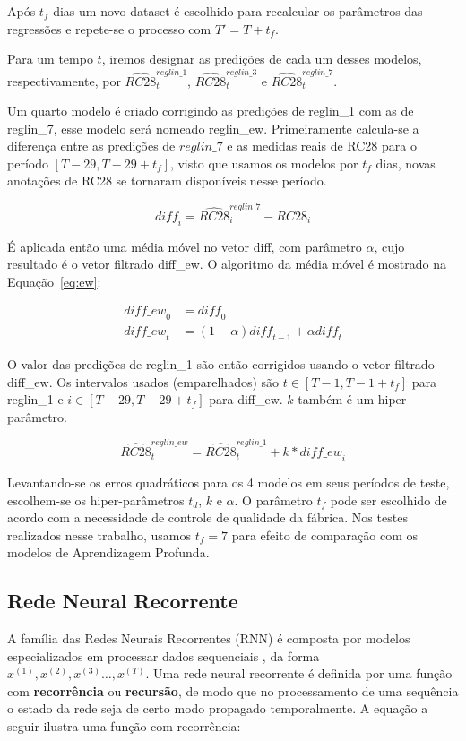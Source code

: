 Após $t_f$ dias um novo dataset é escolhido para recalcular os parâmetros das regressões e repete-se o processo com $T' = T + t_f$.


Para um tempo $t$, iremos designar as predições de cada um desses modelos,
respectivamente, por $\hat{RC28}^{reglin\_1}_t$, $\hat{RC28}^{reglin\_3}_t$ e $\hat{RC28}^{reglin\_7}_t$.

Um quarto modelo é criado corrigindo as predições de reglin\_1 com as de
reglin\_7, esse modelo será nomeado reglin\_ew. Primeiramente calcula-se a
diferença entre as predições de $reglin\_7$ e as medidas reais de RC28 para o período
$[T-29,T-29 + t_f]$, visto que usamos os modelos por $t_f$ dias, novas
anotações de RC28 se tornaram disponíveis nesse período. 


\[
  \mathit{diff}_i = \hat{RC28}^{reglin\_7}_i - RC28_i
\]

É aplicada então uma média móvel no vetor diff, com parâmetro
$\alpha$, cujo resultado é o vetor filtrado diff\_ew. O algoritmo da média móvel
é mostrado na Equação~\ref{eq:ew}:


  \begin{align}
    \mathit{diff\_ew}_0 &= \mathit{diff}_0 \\
  \mathit{diff\_ew}_t &= (1- \alpha)\mathit{diff}_{t-1} + \alpha \mathit{diff}_t 
  \label{eq:ew}
  \end{align}


O valor das predições de reglin\_1 são então corrigidos usando o vetor filtrado
diff\_ew. Os intervalos usados (emparelhados) são $t \in [T-1,T-1+t_f]$ para
reglin\_1 e $i \in [T-29,T-29+t_f]$ para diff\_ew. $k$ também é um hiper-parâmetro.

\[
     \hat{RC28}_t^{reglin\_ew} = \hat{RC28}^{reglin\_1}_t + k * \mathit{diff\_ew}_i
\]


Levantando-se os erros quadráticos para os 4 modelos em seus períodos de
teste, escolhem-se os hiper-parâmetros $t_d$, $k$ e $\alpha$. O parâmetro $t_f$ pode ser
escolhido de acordo com a necessidade de controle de qualidade da fábrica. Nos
testes realizados nesse trabalho, usamos $t_f=7$ para efeito de comparação com
os modelos de Aprendizagem Profunda. 

\subsection{Rede Neural Recorrente}
% 

A família das Redes Neurais Recorrentes (RNN) é composta por modelos especializados
em processar dados sequenciais \citep{dlbook}, da forma $x^{(1)},x^{(2)} ,x^{(3)}\dots ,x^{(T)}$. Uma rede neural recorrente é definida por uma função com
\textbf{recorrência} ou \textbf{recursão}, de modo que no processamento de uma
sequência o estado da rede seja de certo modo propagado temporalmente.
A equação a seguir ilustra uma função com recorrência: \\

